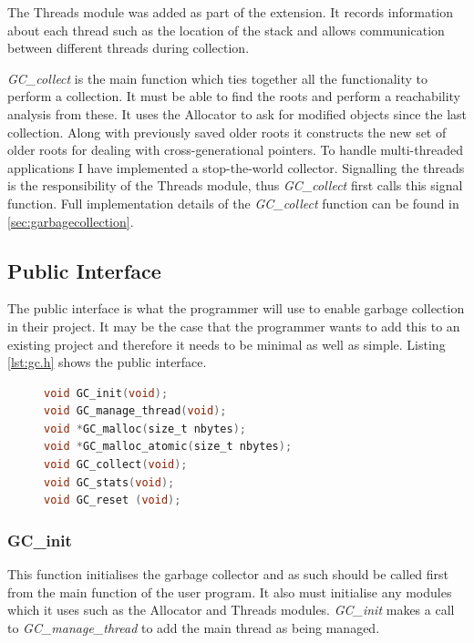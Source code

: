 \documentclass[../diss.tex]{subfiles}
\begin{document}
The Threads module was added as part of the extension. It records information about each thread such as the location of the stack and allows communication between different threads during collection.

\emph{GC\_collect} is the main function which ties together all the functionality to perform a collection. It must be able to find the roots and perform a reachability analysis from these. It uses the Allocator to ask for modified objects since the last collection. Along with previously saved older roots it constructs the new set of older roots for dealing with cross-generational pointers. To handle multi-threaded applications I have implemented a stop-the-world collector. Signalling the threads is the responsibility of the Threads module, thus \emph{GC\_collect} first calls this signal function. Full implementation details of the \emph{GC\_collect} function can be found in \cref{sec:garbagecollection}.

\subsection{Public Interface} \label{sec:interfaceoverview}

The public interface is what the programmer will use to enable garbage collection in their project. It may be the case that the programmer wants to add this to an existing project and therefore it needs to be minimal as well as simple. Listing \ref{lst:gc.h} shows the public interface.

\begin{figure}
\begin{lstlisting}[language=C, caption=gc.h with comments and preprocessor directives removed, label={lst:gc.h}]
void GC_init(void);
void GC_manage_thread(void);
void *GC_malloc(size_t nbytes);
void *GC_malloc_atomic(size_t nbytes);
void GC_collect(void);
void GC_stats(void);
void GC_reset (void);
\end{lstlisting}
\end{figure}

\subsubsection{GC\_init}
This function initialises the garbage collector and as such should be called first from the main function of the user program. It also must initialise any modules which it uses such as the Allocator and Threads modules. \emph{GC\_init} makes a call to \emph{GC\_manage\_thread} to add the main thread as being managed. 
\end{document}
